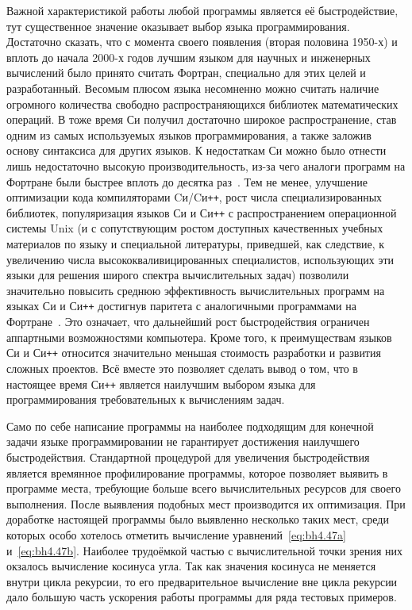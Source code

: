 Важной характеристикой работы любой программы является её
быстродействие, тут существенное значение оказывает выбор языка
программирования.  Достаточно сказать, что с момента своего появления
(вторая половина 1950-х) и вплоть до начала 2000-х годов лучшим языком
для научных и инженерных вычислений было принято считать Фортран,
специально для этих целей и разработанный. Весомым плюсом языка
несомненно можно считать наличие огромного количества свободно
распространяющихся библиотек математических операций. В тоже время Си
получил достаточно широкое распространение, став одним из самых
используемых языков программирования, а также заложив основу
синтаксиса для других языков. К недостаткам Си можно было отнести лишь
недостаточно высокую производительность, из-за чего аналоги программ
на Фортране были быстрее вплоть до десятка
раз~\cite{Veldhuizen-1997}. Тем не менее, улучшение оптимизации кода
компиляторами Cи/Cи\texttt{++}, рост числа специализированных
библиотек, популяризация языков Си и Си\texttt{++} с распространением
операционной системы Unix (и с сопутствующим ростом доступных
качественных учебных материалов по языку и специальной литературы,
приведшей, как следствие, к увеличению числа высококваливицированных
специалистов, использующих эти языки для решения широго спектра
вычислительных задач) позволили значительно повысить среднюю
эффективность вычислительных программ на языках Си и Си\texttt{++}
достигнув паритета с аналогичными программами на
Фортране~\cite{Veldhuizen-1997,Markovich-FDTD-2013}.  Это означает,
что дальнейший рост быстродействия ограничен аппартными возможностями
компьютера.  Кроме того, к преимуществам языков Си и Си\texttt{++}
относится значительно меньшая стоимость разработки и развития сложных
проектов.  Всё вместе это позволяет сделать вывод о том, что в
настоящее время Си\texttt{++} является наилучшим выбором языка для
программирования требовательных к вычислениям задач.

Само по себе написание программы на наиболее подходящим для конечной
задачи языке программировании не гарантирует достижения наилучшего
быстродействия.  Стандартной процедурой для увеличения быстродействия
является времянное профилирование программы, которое позволяет выявить
в программе места, требующие больше всего вычислительных ресурсов для
своего выполнения.  После выявления подобных мест производится их
оптимизация.  При доработке настоящей программы было выявленно
несколько таких мест, среди которых особо хотелось отметить вычисление
уравнений~\ref{eq:bh4.47a} и~\ref{eq:bh4.47b}.  Наиболее трудоёмкой
частью с вычислительной точки зрения них окзалось вычисление косинуса
угла. Так как значения косинуса не меняется внутри цикла рекурсии, то
его предварительное вычисление вне цикла рекурсии дало большую часть
ускорения работы программы для ряда тестовых примеров.

